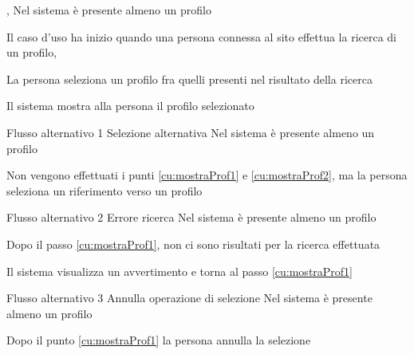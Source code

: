 {, }
{Nel sistema è presente almeno un profilo}
{\postNulle}
{\begin{enumCU}
	\item Il caso d'uso ha inizio quando una persona connessa al sito effettua la ricerca di un profilo, \label{cu:mostraProf1}
	\item La persona seleziona un profilo fra quelli presenti nel risultato della ricerca\label{cu:mostraProf2}
	\item Il sistema mostra alla persona il profilo selezionato
\end{enumCU}}
%
{Flusso alternativo 1}%
{Selezione alternativa}%
{Nel sistema è presente almeno un profilo}%
{\postNulle}%
{\begin{enumCU}
		\item Non vengono effettuati i punti \ref{cu:mostraProf1} e \ref{cu:mostraProf2}, ma la persona seleziona un \gls{riferimento} verso un profilo
\end{enumCU}}%
%
{Flusso alternativo 2}%
{Errore ricerca}%
{Nel sistema è presente almeno un profilo}%
{\postNulle}%
{\begin{enumCU}
		\item Dopo il passo \ref{cu:mostraProf1}, non ci sono risultati per la ricerca effettuata
		\item Il sistema visualizza un avvertimento e torna al passo \ref{cu:mostraProf1}
\end{enumCU}}%
%	
{Flusso alternativo 3}%
{Annulla operazione di selezione}%
{Nel sistema è presente almeno un profilo}%
{\postNulle}%
{\begin{enumCU}
		\item Dopo il punto \ref{cu:mostraProf1} la persona annulla la selezione
\end{enumCU}}%
%
%

